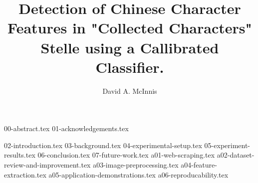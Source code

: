 \documentclass{ewuthesis}
\begin{document}
    \title{Detection of Chinese Character Features in "Collected Characters" Stelle using a Callibrated Classifier.}
    \author{David A. McInnis}    
    
    
    
    
    \frontmatter
    \maketitle
    \makesigpage
    \makelibrarystatement{}
    {00-abstract.tex}
    {01-acknowledgements.tex}
    \mainmatter
    \tableofcontents
    \listoffigures{}
    {02-introduction.tex}
    {03-background.tex}
    {04-experimental-setup.tex}
    {05-experiment-results.tex}
    {06-conclusion.tex}
    {07-future-work.tex}
    \backmatter{}
    {a01-web-scraping.tex}
    {a02-dataset-review-and-improvement.tex}
    {a03-image-preprocessing.tex}
    {a04-feature-extraction.tex}
    {a05-application-demonstrations.tex}
    {a06-reproducability.tex}
    
    



    
    \makevita
    
    
\end{document}
